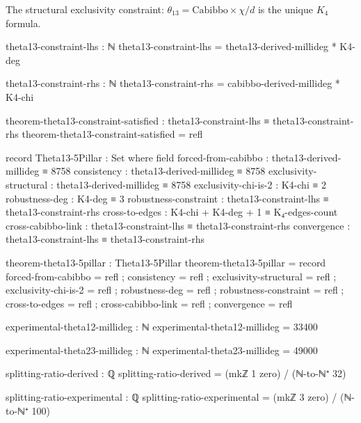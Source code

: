 \documentclass[11pt,a4paper]{book}
\begin{document}
The structural exclusivity constraint: $\theta_{13} = \text{Cabibbo} \times \chi/d$ is the unique $K_4$ formula.

\begin{code}
theta13-constraint-lhs : ℕ
theta13-constraint-lhs = theta13-derived-millideg * K4-deg

theta13-constraint-rhs : ℕ  
theta13-constraint-rhs = cabibbo-derived-millideg * K4-chi

theorem-theta13-constraint-satisfied : theta13-constraint-lhs ≡ theta13-constraint-rhs
theorem-theta13-constraint-satisfied = refl
\end{code}

\begin{code}
record Theta13-5Pillar : Set where
  field
    forced-from-cabibbo    : theta13-derived-millideg ≡ 8758
    consistency            : theta13-derived-millideg ≡ 8758
    exclusivity-structural : theta13-derived-millideg ≡ 8758
    exclusivity-chi-is-2   : K4-chi ≡ 2
    robustness-deg         : K4-deg ≡ 3
    robustness-constraint  : theta13-constraint-lhs ≡ theta13-constraint-rhs
    cross-to-edges         : K4-chi + K4-deg + 1 ≡ K₄-edges-count
    cross-cabibbo-link     : theta13-constraint-lhs ≡ theta13-constraint-rhs
    convergence            : theta13-constraint-lhs ≡ theta13-constraint-rhs

theorem-theta13-5pillar : Theta13-5Pillar
theorem-theta13-5pillar = record
  { forced-from-cabibbo    = refl
  ; consistency            = refl
  ; exclusivity-structural = refl
  ; exclusivity-chi-is-2   = refl
  ; robustness-deg         = refl
  ; robustness-constraint  = refl
  ; cross-to-edges         = refl
  ; cross-cabibbo-link     = refl
  ; convergence            = refl
  }
\end{code}

\begin{code}
experimental-theta12-millideg : ℕ
experimental-theta12-millideg = 33400

experimental-theta23-millideg : ℕ
experimental-theta23-millideg = 49000
\end{code}

\begin{code}
splitting-ratio-derived : ℚ
splitting-ratio-derived = (mkℤ 1 zero) / (ℕ-to-ℕ⁺ 32)
\end{code}

\begin{code}
splitting-ratio-experimental : ℚ
splitting-ratio-experimental = (mkℤ 3 zero) / (ℕ-to-ℕ⁺ 100)
\end{code}
\end{document}
